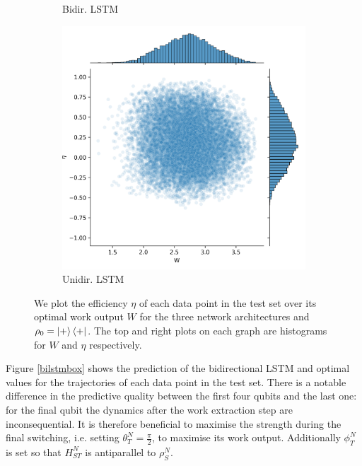 \begin{figure}
\begin{subfigure}{0.32\textwidth}
		\caption{Bidir. LSTM}
		\label{}
	\end{subfigure}
	\begin{subfigure}{0.32\textwidth}
	\centering
	\includegraphics[width=\textwidth]{img/work_dist_n5_eigen_uni}
	\caption{Unidir. LSTM}
	\label{}
\end{subfigure}
	\caption{We plot the efficiency $\eta$ of each data point in the test set over its optimal work output $W$ for the three network architectures and $\rho_0 = \ket{+}\bra{+}$. The top and right plots on each graph are histograms for $W$ and $\eta$ respectively.}
	\label{}
\end{figure}

Figure \ref{bilstmbox} shows the prediction of the bidirectional LSTM and optimal values for the trajectories of each data point in the test set.
There is a notable difference in the predictive quality between the first four qubits and the last one: for the final qubit the dynamics after the work extraction step are inconsequential.
It is therefore beneficial to maximise the strength during the final switching, i.e. setting $\theta_T^N = \frac{\pi}{2}$, to maximise its work output.
Additionally $\phi_T^N$ is set so that $H_{ST}^N$ is antiparallel to $\rho_S^N$.


